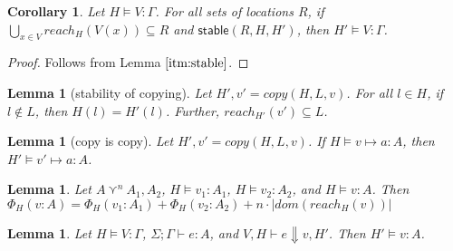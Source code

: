 \documentclass{easychair}
\newcommand{\stable}[1]{\mathsf{stable}(#1)}
\newtheorem{lemma}[theorem]{Lemma}
\newtheorem{corollary}[theorem]{Corollary}
\theoremstyle{definition}
\begin{document}
\begin{corollary}
Let $H \vDash V : \Gamma$. For all sets of locations $R$, if $\bigcup_{x \in V} reach_H(V(x)) \subseteq R$ and $\stable{R,H,H'}$, then $H' \vDash V : \Gamma$.
\end{corollary}

\begin{proof}
Follows from Lemma $\ref{itm:stable}$.
\end{proof}


\begin{lemma}[stability of copying]
	Let $H',v' = copy(H,L,v)$. For all $l \in H$, if $l \notin L$, then $H(l) = H'(l)$. 
	Further, $reach_{H'}(v') \subseteq L$.
\end{lemma}

\begin{lemma}[copy is copy]
	Let $H',v' = copy(H,L,v)$. If $H \vDash v \mapsto a : A$, then $H' \vDash v' \mapsto a : A$.
\end{lemma}

\begin{lemma}
	Let $A \curlyvee^n A_1,A_2$, $H \vDash v_1 : A_1$, $H \vDash v_2 : A_2$, 
	and $H \vDash v : A$. Then $\Phi_{H}(v : A) = 
	\Phi_{H}(v_1 : A_1) + \Phi_{H}(v_2 : A_2) + n\cdot |dom(reach_H(v))|$
\end{lemma}

\begin{lemma}
	Let $H \vDash V : \Gamma$, $\Sigma;\Gamma \vdash e : A$, and $V,H \vdash e \Downarrow v,H'$. Then 
	$H' \vDash v : A$.
\end{lemma}
\end{document}
